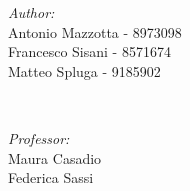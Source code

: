 \begin{titlepage}
	\begin{minipage}{0.4\textwidth}
		\begin{flushleft} \large
			\emph{Author:}\\[0.2cm]
			Antonio Mazzotta - 8973098\\
			Francesco Sisani - 8571674\\
			Matteo Spluga - 9185902\\
		\end{flushleft}
	\end{minipage}
	~
	\begin{minipage}{0.4\textwidth}
		\begin{flushright} \large
			\emph{Professor:} \\[0.2cm]
			Maura Casadio\\ %
			Federica Sassi\\
		\end{flushright}
	\end{minipage}\\[2cm]
	\makeatother
	
	
	
	
	\vfill %
	
\end{titlepage}